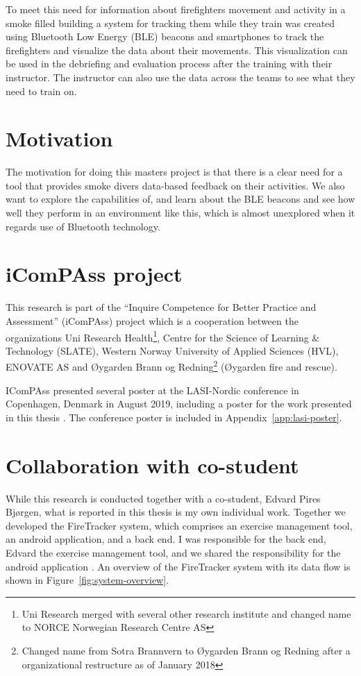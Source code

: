 \documentclass[../Main/thesis.tex]{subfiles}
\begin{document}
To meet this need for information about firefighters movement and activity in a smoke filled building a system for tracking them while they train was created using Bluetooth Low Energy (BLE) beacons and smartphones to track the firefighters and visualize the data about their movements. 
This visualization can be used in the debriefing and evaluation process after the training with their instructor.
The instructor can also use the data across the teams to see what they need to train on.

\section{Motivation}
The motivation for doing this masters project is that there is a clear need for a tool that provides smoke divers data-based feedback on their activities.
We also want to explore the capabilities of, and learn about the BLE beacons and see how well they perform in an environment like this, which is almost unexplored when it regards use of Bluetooth technology. 

\section{iComPAss project}
This research is part of the ``Inquire Competence for Better Practice and Assessment'' (iComPAss) project which is a cooperation between the organizations Uni Research Health\footnote{Uni Research merged with several other research institute and changed name to NORCE Norwegian Research Centre AS}, Centre for the Science of Learning \& Technology (SLATE), Western Norway University of Applied Sciences (HVL), ENOVATE AS and Øygarden Brann og Redning\footnote{Changed name from Sotra Brannvern to Øygarden Brann og Redning after a organizational restructure as of January 2018} (Øygarden fire and rescue). 
\citep{Netteland2016}

IComPAss presented several poster at the LASI-Nordic conference in Copenhagen, Denmark in August 2019, including a poster for the work presented in this thesis \citep{Wake2018}. 
The conference poster is included in Appendix~\ref{app:lasi-poster}.

\section{Collaboration with co-student}
While this research is conducted together with a co-student, Edvard Pires Bjørgen, what is reported in this thesis is my own individual work.
Together we developed the FireTracker system, which comprises an exercise management tool, an android application, and a back end.
I was responsible for the back end, Edvard the exercise management tool, and we shared the responsibility for the android application \citep{Bjorgen2018}.
An overview of the FireTracker system with its data flow is shown in Figure~\ref{fig:system-overview}.
\end{document}
